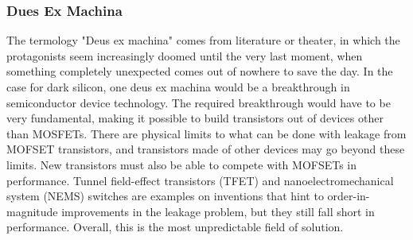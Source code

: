 \subsubsection{Dues Ex Machina}
The termology "Deus ex machina" comes from literature or theater, in which the protagonists seem increasingly doomed until the very last moment, when something completely unexpected comes out of nowhere to save the day.
In the case for dark silicon, one deus ex machina would be a breakthrough in semiconductor device technology.
The required breakthrough would have to be very fundamental, making it possible to build transistors out of devices other than MOSFETs. 
There are physical limits to what can be done with leakage from MOFSET transistors, and transistors made of other devices may go beyond these limits.
New transistors must also be able to compete with MOFSETs in performance.
Tunnel field-effect transistors (TFET) and nanoelectromechanical system (NEMS) switches are examples on inventions that hint to order-in-magnitude improvements in the leakage problem, but they still fall short in performance.
Overall, this is the most unpredictable field of solution. \cite{dark-silicon}



